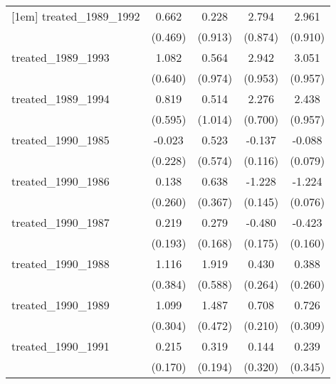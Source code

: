 {\begin{tabular}{l*{4}{c}}
[1em]
treated\_1989\_1992&       0.662         &       0.228         &       2.794\sym{**} &       2.961\sym{**} \\
            &     (0.469)         &     (0.913)         &     (0.874)         &     (0.910)         \\
[1em]
treated\_1989\_1993&       1.082         &       0.564         &       2.942\sym{**} &       3.051\sym{**} \\
            &     (0.640)         &     (0.974)         &     (0.953)         &     (0.957)         \\
[1em]
treated\_1989\_1994&       0.819         &       0.514         &       2.276\sym{**} &       2.438\sym{*}  \\
            &     (0.595)         &     (1.014)         &     (0.700)         &     (0.957)         \\
[1em]
treated\_1990\_1985&      -0.023         &       0.523         &      -0.137         &      -0.088         \\
            &     (0.228)         &     (0.574)         &     (0.116)         &     (0.079)         \\
[1em]
treated\_1990\_1986&       0.138         &       0.638         &      -1.228\sym{***}&      -1.224\sym{***}\\
            &     (0.260)         &     (0.367)         &     (0.145)         &     (0.076)         \\
[1em]
treated\_1990\_1987&       0.219         &       0.279         &      -0.480\sym{**} &      -0.423\sym{**} \\
            &     (0.193)         &     (0.168)         &     (0.175)         &     (0.160)         \\
[1em]
treated\_1990\_1988&       1.116\sym{**} &       1.919\sym{**} &       0.430         &       0.388         \\
            &     (0.384)         &     (0.588)         &     (0.264)         &     (0.260)         \\
[1em]
treated\_1990\_1989&       1.099\sym{***}&       1.487\sym{**} &       0.708\sym{***}&       0.726\sym{*}  \\
            &     (0.304)         &     (0.472)         &     (0.210)         &     (0.309)         \\
[1em]
treated\_1990\_1991&       0.215         &       0.319         &       0.144         &       0.239         \\
            &     (0.170)         &     (0.194)         &     (0.320)         &     (0.345)         \\

\end{tabular}}

